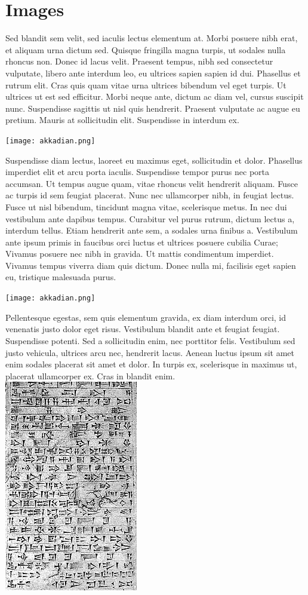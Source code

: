 \chapter{Images} 
Sed blandit sem velit, sed iaculis lectus elementum at. Morbi posuere nibh erat, et aliquam urna dictum sed. Quisque fringilla magna turpis, ut sodales nulla rhoncus non. Donec id lacus velit. Praesent tempus, nibh sed consectetur vulputate, libero ante interdum leo, eu ultrices sapien sapien id dui. Phasellus et rutrum elit. Cras quis quam vitae urna ultrices bibendum vel eget turpis. Ut ultrices ut est sed efficitur. Morbi neque ante, dictum ac diam vel, cursus suscipit nunc. Suspendisse sagittis ut nisl quis hendrerit. Praesent vulputate ac augue eu pretium. Mauris at sollicitudin elit. Suspendisse in interdum ex.

\texttt{[image: akkadian.png]}

   
   Suspendisse diam lectus, laoreet eu maximus eget, sollicitudin et dolor. Phasellus imperdiet elit et arcu porta iaculis. Suspendisse tempor purus nec porta accumsan. Ut tempus augue quam, vitae rhoncus velit hendrerit aliquam. Fusce ac turpis id sem feugiat placerat. Nunc nec ullamcorper nibh, in feugiat lectus. Fusce ut nisl bibendum, tincidunt magna vitae, scelerisque metus. In nec dui vestibulum ante dapibus tempus. Curabitur vel purus rutrum, dictum lectus a, interdum tellus. Etiam hendrerit ante sem, a sodales urna finibus a. Vestibulum ante ipsum primis in faucibus orci luctus et ultrices posuere cubilia Curae; Vivamus posuere nec nibh in gravida. Ut mattis condimentum imperdiet. Vivamus tempus viverra diam quis dictum. Donec nulla mi, facilisis eget sapien eu, tristique malesuada purus. 
   
\texttt{[image: akkadian.png]}

Pellentesque egestas, sem quis elementum gravida, ex diam interdum orci, id venenatis justo dolor eget risus. Vestibulum blandit ante et feugiat feugiat. Suspendisse potenti. Sed a sollicitudin enim, nec porttitor felis. Vestibulum sed justo vehicula, ultrices arcu nec, hendrerit lacus. Aenean luctus ipsum sit amet enim sodales placerat sit amet et dolor. In turpis ex, scelerisque in maximus ut, placerat ullamcorper ex. Cras in blandit enim. 
\includegraphics{tablet.jpg}



